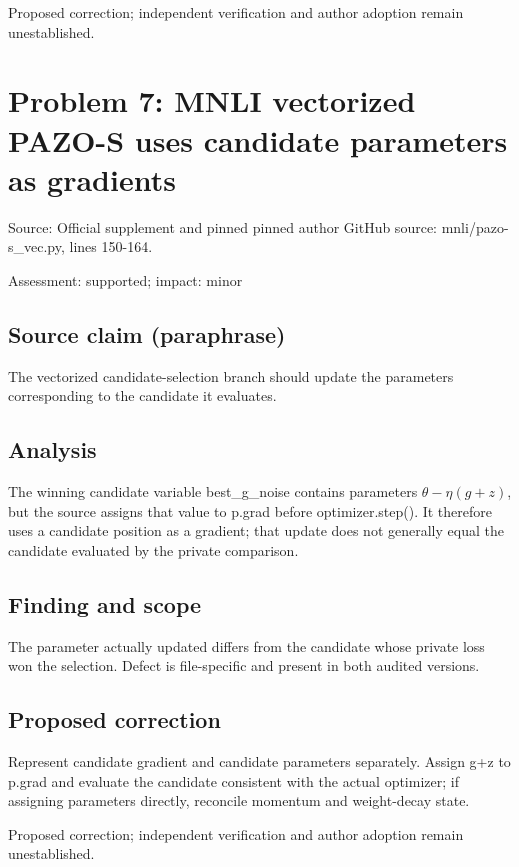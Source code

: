 \documentclass[11pt]{article}
\begin{document}
Proposed correction; independent verification and author adoption remain unestablished.

\section*{Problem 7: MNLI vectorized PAZO-S uses candidate parameters as gradients}

Source: Official supplement and pinned pinned author GitHub source: mnli/pazo-s\_vec.py, lines 150-164.

Assessment: supported; impact: minor

\subsection*{Source claim (paraphrase)}

The vectorized candidate-selection branch should update the parameters corresponding to the candidate it evaluates.

\subsection*{Analysis}

The winning candidate variable best\_g\_noise contains parameters \(\theta-\eta(g+z)\), but the source assigns that value to p.grad before optimizer.step(). It therefore uses a candidate position as a gradient; that update does not generally equal the candidate evaluated by the private comparison.

\subsection*{Finding and scope}

The parameter actually updated differs from the candidate whose private loss won the selection. Defect is file-specific and present in both audited versions.

\subsection*{Proposed correction}

Represent candidate gradient and candidate parameters separately. Assign g+z to p.grad and evaluate the candidate consistent with the actual optimizer; if assigning parameters directly, reconcile momentum and weight-decay state.

Proposed correction; independent verification and author adoption remain unestablished.
\end{document}
